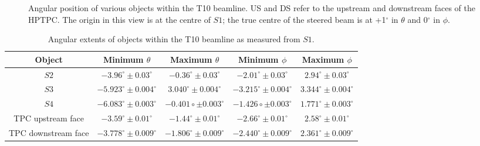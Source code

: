 \begin{figure}[ht]
  \begin{adjustbox}{max totalsize={0.7\textwidth}{.5\textheight},center}
    
  \end{adjustbox}
  \caption{Angular position of various objects within the T10 beamline. US and DS refer to the upstream and downstream faces of the HPTPC. The origin in this view is at the centre of $\mathit{S1}$; the true centre of the steered beam is at +1$^{\circ}$ in $\theta$ and 0$^{\circ}$ in $\phi$.}
  \label{fig:angularDistS1}
\end{figure}

\begin{table}
  \centering
  \caption{Angular extents of objects within the T10 beamline as measured from $\mathit{S1}$.}
  \begin{tabular}{c|c c c c}
    \hline
    \hline
    Object & Minimum $\theta$ & Maximum $\theta$ & Minimum $\phi$ & Maximum $\phi$ \\
    \hline
    $\mathit{S2}$ & $-3.96^{\circ} \pm 0.03^{\circ}$ & $-0.36^{\circ} \pm 0.03^{\circ}$ & $-2.01^{\circ} \pm 0.03^{\circ}$ & $2.94^{\circ} \pm 0.03^{\circ}$ \\
    $\mathit{S3}$ & $-5.923^{\circ} \pm 0.004^{\circ}$ & \hspace{6pt} $3.040^{\circ} \pm 0.004^{\circ}$ & $-3.215^{\circ} \pm 0.004^{\circ}$ & $3.344^{\circ} \pm 0.004^{\circ}$ \\
   $\mathit{S4}$ & $-6.083^{\circ} \pm 0.003^{\circ}$ & $-0.401{\circ} \pm 0.003^{\circ}$ & $-1.426{\circ} \pm 0.003^{\circ}$ & $1.771^{\circ} \pm 0.003^{\circ}$ \\
    TPC upstream face & $-3.59^{\circ} \pm 0.01^{\circ}$ & $-1.44^{\circ} \pm 0.01^{\circ}$ & $-2.66^{\circ} \pm 0.01^{\circ}$ & $2.58^{\circ} \pm 0.01^{\circ}$ \\
    TPC downstream face & $-3.778^{\circ} \pm 0.009^{\circ}$ & $-1.806^{\circ} \pm 0.009^{\circ}$ & $-2.440^{\circ} \pm 0.009^{\circ}$ & $2.361^{\circ} \pm 0.009^{\circ}$ \\
    \hline
  \end{tabular}
  \label{tab:angS1}
\end{table}


